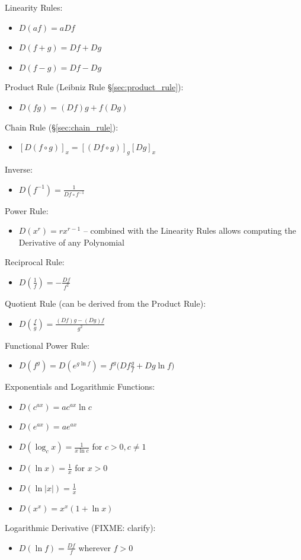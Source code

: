 {Linearity Rules:
\begin{itemize}
  \item $D(af) = a Df$
  \item $D(f+g) = Df + Dg$
  \item $D(f-g) = Df - Dg$
\end{itemize}
Product Rule (Leibniz Rule \S\ref{sec:product_rule}):
\begin{itemize}
  \item $D(fg) = (Df)g + f(Dg)$
\end{itemize}
Chain Rule (\S\ref{sec:chain_rule}):
\begin{itemize}
  \item $[D(f \circ g)]_x = [(Df \circ g)]_g [Dg]_x$
\end{itemize}
Inverse:
\begin{itemize}
  \item $D(f^{-1}) = \frac{1}{Df \circ f^{-1}}$
\end{itemize}
Power Rule:
\begin{itemize}
  \item $D(x^r) = rx^{r-1}$ -- combined with the Linearity Rules allows
    computing the Derivative of any Polynomial
\end{itemize}
Reciprocal Rule:
\begin{itemize}
  \item $D(\frac{1}{f}) = -\frac{Df}{f^2}$
\end{itemize}
Quotient Rule (can be derived from the Product Rule):
\begin{itemize}
  \item $D(\frac{f}{g}) = \frac{(Df)g - (Dg)f}{g^2}$
\end{itemize}
Functional Power Rule:
\begin{itemize}
  \item $D(f^g) = D(e^{g \ln f}) = f^g \big(Df \frac{g}{f} + Dg \ln f\big)$
\end{itemize}
Exponentials and Logarithmic Functions:
\begin{itemize}
  \item $D(c^{ax}) = a c^{ax} \ln{c}$
  \item $D(e^{ax}) = a e^{ax}$
  \item $D(\log_c{x}) = \frac{1}{x \ln c}$ for $c > 0, c \neq 1$
  \item $D(\ln{x}) = \frac{1}{x}$ for $x > 0$
  \item $D(\ln{|x|}) = \frac{1}{x}$
  \item $D(x^x) = x^x(1 + \ln{x})$
\end{itemize}
Logarithmic Derivative (FIXME: clarify):
\begin{itemize}
  \item $D(\ln{f}) = \frac{Df}{f}$ wherever $f > 0$
\end{itemize}


}
